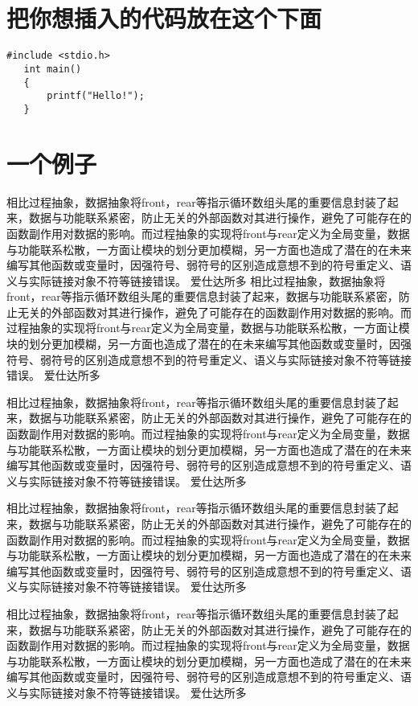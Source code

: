 \documentclass[UTF8]{ctexart}
\begin{document}
~\\
~\\

\section{把你想插入的代码放在这个下面}
\begin{lstlisting}[language={[ANSI]C}]
   #include <stdio.h>
   int main()
   {
       printf("Hello!");
   }

\end{lstlisting}
\section{一个例子}
    相比过程抽象，数据抽象将front，rear等指示循环数组头尾的重要信息封装了起来，数据与功能联系紧密，防止无关的外部函数对其进行操作，避免了可能存在的函数副作用对数据的影响。而过程抽象的实现将front与rear定义为全局变量，数据与功能联系松散，一方面让模块的划分更加模糊，另一方面也造成了潜在的在未来编写其他函数或变量时，因强符号、弱符号的区别造成意想不到的符号重定义、语义与实际链接对象不符等链接错误。
    爱仕达所多
    相比过程抽象，数据抽象将front，rear等指示循环数组头尾的重要信息封装了起来，数据与功能联系紧密，防止无关的外部函数对其进行操作，避免了可能存在的函数副作用对数据的影响。而过程抽象的实现将front与rear定义为全局变量，数据与功能联系松散，一方面让模块的划分更加模糊，另一方面也造成了潜在的在未来编写其他函数或变量时，因强符号、弱符号的区别造成意想不到的符号重定义、语义与实际链接对象不符等链接错误。
    爱仕达所多

    相比过程抽象，数据抽象将front，rear等指示循环数组头尾的重要信息封装了起来，数据与功能联系紧密，防止无关的外部函数对其进行操作，避免了可能存在的函数副作用对数据的影响。而过程抽象的实现将front与rear定义为全局变量，数据与功能联系松散，一方面让模块的划分更加模糊，另一方面也造成了潜在的在未来编写其他函数或变量时，因强符号、弱符号的区别造成意想不到的符号重定义、语义与实际链接对象不符等链接错误。
    爱仕达所多

    相比过程抽象，数据抽象将front，rear等指示循环数组头尾的重要信息封装了起来，数据与功能联系紧密，防止无关的外部函数对其进行操作，避免了可能存在的函数副作用对数据的影响。而过程抽象的实现将front与rear定义为全局变量，数据与功能联系松散，一方面让模块的划分更加模糊，另一方面也造成了潜在的在未来编写其他函数或变量时，因强符号、弱符号的区别造成意想不到的符号重定义、语义与实际链接对象不符等链接错误。
    爱仕达所多

    相比过程抽象，数据抽象将front，rear等指示循环数组头尾的重要信息封装了起来，数据与功能联系紧密，防止无关的外部函数对其进行操作，避免了可能存在的函数副作用对数据的影响。而过程抽象的实现将front与rear定义为全局变量，数据与功能联系松散，一方面让模块的划分更加模糊，另一方面也造成了潜在的在未来编写其他函数或变量时，因强符号、弱符号的区别造成意想不到的符号重定义、语义与实际链接对象不符等链接错误。
    爱仕达所多
\end{document}
